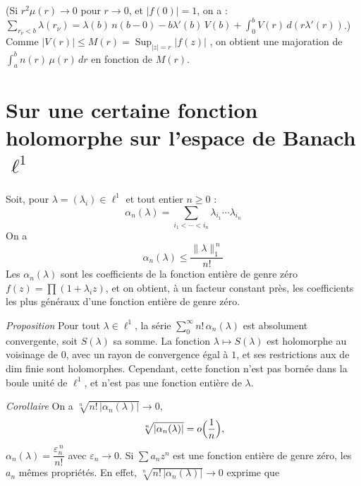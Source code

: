 \documentclass[11pt,a4paper]{article}
\begin{document}
(Si $r^2\mu(r) \to 0$ pour $r \to 0$, et $|f(0)| = 1$, on a : $\sum_{r_\nu < b} \lambda(r_\nu) = \lambda(b)\,n(b-0) - b\lambda'(b)\,V(b) + \int_0^b V(r)\, d(r\lambda'(r))$.) Comme $|V(r)| \leq M(r) = \operatorname{Sup}_{|z|=r} |f(z)|$ , on obtient une majoration de  $\int_a^b n(r)\,\mu(r)\,dr$ en fonction de $M(r)$. 

\section{Sur une certaine fonction holomorphe sur l'espace de Banach $\ell^1$}


Soit, pour $\lambda = (\lambda_i) \in \ell^1$ et tout entier $n \geq 0$ :
\[
  \alpha_n(\lambda) = \sum_{i_1 < \cdots < i_n} \lambda_{i_1} \cdots \lambda_{i_n}
\]
On a
\[
  \alpha_n(\lambda) \leq \frac{\|\lambda\|_1^{\,n}}{n!}
\]
Les $\alpha_n(\lambda)$ sont les coefficients de la fonction entière de genre zéro $f(z) = \prod (1 + \lambda_i z)$, et on obtient, à un facteur constant près, les coefficients les plus généraux d'une fonction entière de genre zéro.

\emph{Proposition} Pour tout $\lambda \in \ell^1$, la série $\sum_0^{\infty} n!\,\alpha_n(\lambda)$ est absolument convergente, soit $S(\lambda)$ sa somme. La fonction $\lambda \mapsto S(\lambda)$ est holomorphe au voisinage de $0$, avec un rayon de convergence égal à $1$, et ses restrictions aux  \struck{\ill{}} \ill{} de dim finie sont holomorphes. Cependant, \struck{\ill{}} cette fonction n'est pas bornée dans la boule unité de $\ell^1$, et n'est pas  une fonction entière de $\lambda$. 

\emph{Corollaire} On a  $\sqrt[n]{n!\,|\alpha_n(\lambda)|} \to 0$,
\[
  \sqrt[n]{|\alpha_n(\lambda)|} = o\Bigl(\frac{1}{n}\Bigr),
\]
$\alpha_n(\lambda) = \dfrac{\varepsilon_n^{\,n}}{n!}$ avec $\varepsilon_n \to 0$. Si $\sum a_n z^n$ est une fonction entière de genre zéro, les \struck{\ill{}} $a_n$   mêmes propriétés. En effet, $\sqrt[n]{n!\,|\alpha_n(\lambda)|} \to 0$ exprime que
\end{document}
